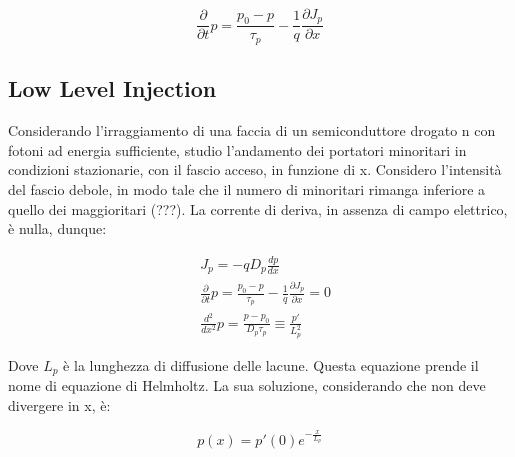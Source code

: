 \documentclass{article}
\begin{document}
\begin{equation}
    \frac{\partial}{\partial t} p= \frac{p_0-p}{\tau_p}- \frac{1}{q}\frac{\partial J_p}{\partial x}
\end{equation}

\subsection{Low Level Injection}
Considerando l'irraggiamento di una faccia di un semiconduttore drogato n con fotoni ad energia sufficiente, studio l'andamento dei portatori minoritari in condizioni stazionarie, con il fascio acceso, in funzione di x.
Considero l'intensità del fascio debole, in modo tale che il numero di minoritari rimanga inferiore a quello dei maggioritari (???).
La corrente di deriva, in assenza di campo elettrico, è nulla, dunque:

\begin{equation}
    \begin{aligned}
         & J_p=-qD_p\frac{dp}{dx}                                                                            \\
         & \frac{\partial}{\partial t} p= \frac{p_0-p}{\tau_p}- \frac{1}{q}\frac{\partial J_p}{\partial x}=0 \\
         & \frac{d^2}{dx^2} p= \frac{p-p_0}{D_p \tau_p}\equiv \frac{p'}{L_p^2}
    \end{aligned}
\end{equation}

Dove $L_p$ è la lunghezza di diffusione delle lacune.
Questa equazione prende il nome di equazione di Helmholtz.
La sua soluzione, considerando che non deve divergere in x, è:

\begin{equation}
    p(x)= p'(0)e^{-\frac{x}{L_p}}
\end{equation}
\end{document}
